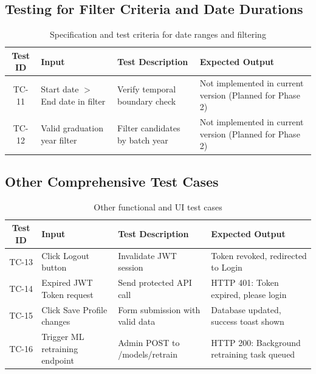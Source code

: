 \documentclass[12pt,a4paper]{report}
\begin{document}
\subsection{Testing for Filter Criteria and Date Durations}
\begin{table}[htbp]
 \caption{Specification and test criteria for date ranges and filtering}
    \label{tab:test_duration}
    \centering
    \begin{tabularx}{\textwidth}{|c|X|X|X|}
        \hline
        \textbf{Test ID} & \textbf{Input} & \textbf{Test Description} & \textbf{Expected Output} \\
        \hline
        TC-11 & Start date $>$ End date in filter & Verify temporal boundary check & Not implemented in current version (Planned for Phase 2) \\
        \hline
        TC-12 & Valid graduation year filter & Filter candidates by batch year & Not implemented in current version (Planned for Phase 2) \\
        \hline
    \end{tabularx}
\end{table}

\subsection{Other Comprehensive Test Cases}
\begin{table}[htbp]
 \caption{Other functional and UI test cases}
    \label{tab:other_test_cases}
    \centering
    \begin{tabularx}{\textwidth}{|c|X|X|X|}
        \hline
        \textbf{Test ID} & \textbf{Input} & \textbf{Test Description} & \textbf{Expected Output} \\
        \hline
        TC-13 & Click Logout button & Invalidate JWT session & Token revoked, redirected to Login \\
        \hline
        TC-14 & Expired JWT Token request & Send protected API call & HTTP 401: Token expired, please login \\
        \hline
        TC-15 & Click Save Profile changes & Form submission with valid data & Database updated, success toast shown \\
        \hline
        TC-16 & Trigger ML retraining endpoint & Admin POST to /models/retrain & HTTP 200: Background retraining task queued \\
        \hline
    \end{tabularx}
\end{table}
\end{document}

